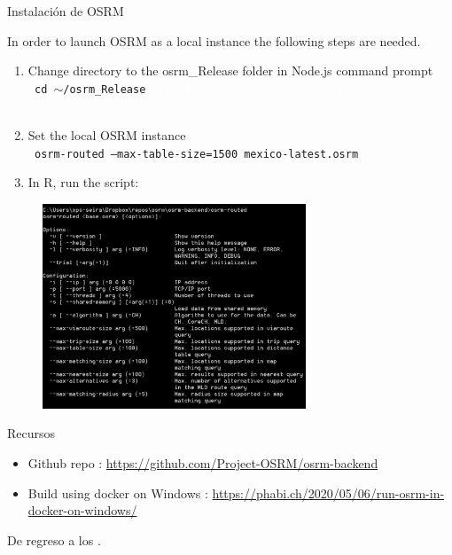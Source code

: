\documentclass[8pt]{beamer}
\begin{document}
\begin{frame}[allowframebreaks]{Instalación de OSRM}
    
In order to launch OSRM as a local instance the following steps are needed.
    \begin{enumerate}
        \item Change directory to the osrm\_Release folder in  Node.js command prompt\\
        
        \texttt{         cd $\sim$/osrm\_Release}
        \textcolor{white}{      cd C:/Users/xps-seira/Dropbox/repos/osrm/osrm-backend      }

        \item Set the local OSRM instance\\
        
        \texttt{         osrm-routed --max-table-size=1500 mexico-latest.osrm }
        \item In R, run the script:
    \end{enumerate}
    


\framebreak


\begin{figure}[H]
    \begin{center}
        \includegraphics[width=0.7\textwidth]{Figuras/osrm.pdf}
        \end{center}
\end{figure}
\end{frame}

\begin{frame}{Recursos}
\begin{itemize}
    \item Github repo : \href{https://github.com/Project-OSRM/osrm-backend}{https://github.com/Project-OSRM/osrm-backend}
    \item Build using docker on Windows : \href{https://phabi.ch/2020/05/06/run-osrm-in-docker-on-windows/}{https://phabi.ch/2020/05/06/run-osrm-in-docker-on-windows/}
\end{itemize}

\vspace{35mm}
De regreso a los \hyperlink{inst}{}.

\end{frame}
\end{document}
